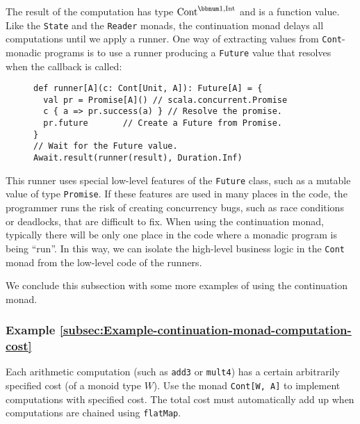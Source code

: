 The result of the computation has type $\text{Cont}^{\bbnum 1,\text{Int}}$
and is a function value. Like the \lstinline!State! and the \lstinline!Reader!
monads, the continuation monad delays all computations until we apply
a runner. One way of extracting values from
\lstinline!Cont!-monadic programs is to use a runner producing a
\lstinline!Future! value that resolves when the callback is called:

\begin{wrapfigure}{l}{0.515\columnwidth}%
\vspace{-0.8\baselineskip}
\begin{lstlisting}
def runner[A](c: Cont[Unit, A]): Future[A] = {
  val pr = Promise[A]() // scala.concurrent.Promise
  c { a => pr.success(a) } // Resolve the promise.
  pr.future       // Create a Future from Promise.
}
// Wait for the Future value.
Await.result(runner(result), Duration.Inf)
\end{lstlisting}

\vspace{-1\baselineskip}
\end{wrapfigure}%

\noindent This runner uses special low-level features of the \lstinline!Future!
class, such as a mutable value of type \lstinline!Promise!. If these
features are used in many places in the code, the programmer runs
the risk of creating concurrency bugs, such as race conditions or
deadlocks, that are difficult to fix. When using the continuation
monad, typically there will be only one place in the code where a
monadic program is being \textsf{``}run\textsf{''}. In this way, we can isolate the
high-level business logic in the \lstinline!Cont! monad from the
low-level code of the runners.

We conclude this subsection with some more examples of using the continuation
monad.

\subsubsection{Example \label{subsec:Example-continuation-monad-computation-cost}\ref{subsec:Example-continuation-monad-computation-cost}}

Each arithmetic computation (such as \lstinline!add3! or \lstinline!mult4!)
has a certain arbitrarily specified cost (of a monoid type $W$).
Use the monad \lstinline!Cont[W, A]! to implement computations with
specified cost. The total cost must automatically add up when computations
are chained using \lstinline!flatMap!.

